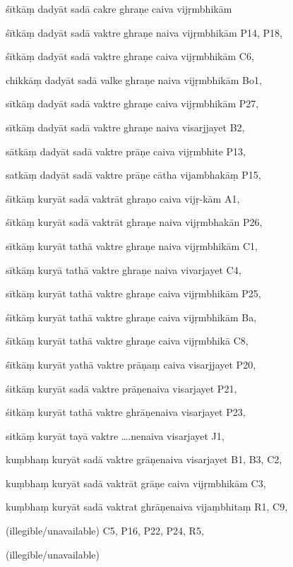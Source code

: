 \begin{marma}[hp02_009]
\begin{marma}[hp02_011]
\begin{marma}[hp02_55ab]
\item[śītkāṃ dadyāt sadā cakre ghraṇe caiva vijṛmbhikām]
\item[śītkāṃ dadyāt sadā vaktre ghraṇe naiva vijṛmbhikām] P14, P18, 
\item[śītkāṃ dadyāt sadā vaktre ghraṇe caiva vijṛmbhikām] C6, 
\item[chikkāṃ dadyāt sadā valke ghraṇe naiva vijṛmbhikām] Bo1, 
\item[sītkāṃ dadyāt sadā vaktre ghraṇe caiva vijṛmbhikām] P27,
\item[sītkāṃ dadyāt sadā vaktre ghraṇe naiva visarjjayet] B2,
\item[sātkāṃ dadyāt sadā vaktre prāṇe caiva vijṛmbhite] P13,
\item[satkāṃ dadyāt sadā vaktre prāṇe cātha vijambhakāṃ] P15,
\item[śītkāṃ kuryāt sadā vaktrāt ghraṇo caiva vijṛ-kām] A1,
\item[śītkāṃ kuryāt sadā vaktrāt ghraṇe naiva vijṛmbhakān] P26,
\item[sītkāṃ kuryāt tathā vaktre ghraṇe naiva vijṛmbhikām] C1,
\item[sītkāṃ kuryā tathā vaktre ghraṇe naiva vivarjayet] C4,
\item[sītkāṃ kuryāt tathā vaktre ghraṇe caiva vijṛmbhikām] P25,  
\item[śītkāṃ kuryāt tathā vaktre ghraṇe caiva vijṛmbhikām] Ba,  
\item[śītkāṃ kuryāt tathā vaktre ghraṇe caiva vijṛmbhikā] C8,  
\item[śītkāṃ kuryāt yathā vaktre prāṇaṃ caiva visarjjayet] P20, 
\item[śitkāṃ kuryāt sadā vaktre prāṇenaiva visarjayet] P21,
\item[śitkāṃ kuryāt tathā vaktre ghrāṇenaiva visarjayet] P23, 
\item[sitkāṃ kuryāt tayā vaktre ….nenaiva visarjayet] J1,
\item[kuṃbhaṃ kuryāt sadā vaktre grāṇenaiva visarjayet] B1, B3, C2,  
\item[kuṃbhaṃ kuryāt sadā vaktrāt grāṇe caiva vijṛmbhikām] C3,
\item[kuṃbhaṃ kuryāt sadā vaktrat ghrāṇenaiva vijaṃbhitaṃ] R1, C9,  
\item[(illegible/unavailable)] C5, P16, P22, P24, R5,

\item[]
\item[(illegible/unavailable)] 


\end{marma}
\end{marma}
\end{marma}
